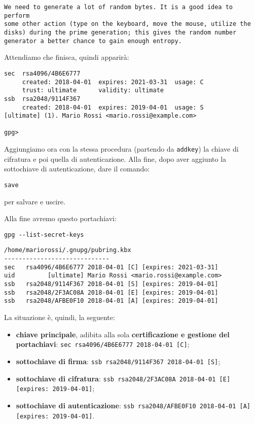 \documentclass[a4paper,10pt]{article}
\begin{document}
\begin{verbatim}
We need to generate a lot of random bytes. It is a good idea to perform
some other action (type on the keyboard, move the mouse, utilize the
disks) during the prime generation; this gives the random number
generator a better chance to gain enough entropy.
\end{verbatim}


Attendiamo che finisca, quindi apparirà:

\begin{verbatim}
sec  rsa4096/4B6E6777
     created: 2018-04-01  expires: 2021-03-31  usage: C
     trust: ultimate      validity: ultimate
ssb  rsa2048/9114F367
     created: 2018-04-01  expires: 2019-04-01  usage: S
[ultimate] (1). Mario Rossi <mario.rossi@example.com>

gpg>
\end{verbatim}


Aggiungiamo ora con la stessa procedura (partendo da \texttt{addkey}) la chiave di cifratura e poi quella di autenticazione.
Alla fine, dopo aver aggiunto la sottochiave di autenticazione, dare il comando:

\begin{verbatim}
save
\end{verbatim}

per salvare e uscire.

Alla fine avremo questo portachiavi:

\begin{verbatim}
gpg --list-secret-keys
\end{verbatim}


\begin{verbatim}
/home/mariorossi/.gnupg/pubring.kbx
-----------------------------
sec   rsa4096/4B6E6777 2018-04-01 [C] [expires: 2021-03-31]
uid         [ultimate] Mario Rossi <mario.rossi@example.com>
ssb   rsa2048/9114F367 2018-04-01 [S] [expires: 2019-04-01]
ssb   rsa2048/2F3AC08A 2018-04-01 [E] [expires: 2019-04-01]
ssb   rsa2048/AFBE0F10 2018-04-01 [A] [expires: 2019-04-01]
\end{verbatim}

La situazione è, quindi, la seguente:

\begin{itemize}
 \item \textbf{chiave principale}, adibita alla sola \textbf{certificazione e gestione del portachiavi}: \newline \texttt{sec   rsa4096/4B6E6777 2018-04-01 [C]};
 \item \textbf{sottochiave di firma}: \newline \texttt{ssb   rsa2048/9114F367 2018-04-01 [S]};
 \item \textbf{sottochiave di cifratura}: \newline \texttt{ssb   rsa2048/2F3AC08A 2018-04-01 [E] [expires: 2019-04-01]};
 \item \textbf{sottochiave di autenticazione}: \newline \texttt{ssb   rsa2048/AFBE0F10 2018-04-01 [A] [expires: 2019-04-01]}.
\end{itemize}
\end{document}

